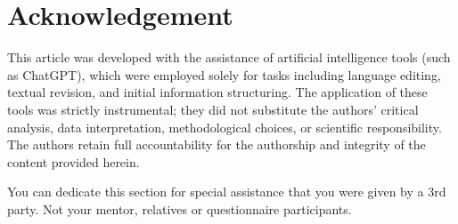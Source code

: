 \section*{Acknowledgement}

This article was developed with the assistance of artificial intelligence tools (such as ChatGPT), which were employed solely for tasks including language editing, textual revision, and initial information structuring. The application of these tools was strictly instrumental; they did not substitute the authors' critical analysis, data interpretation, methodological choices, or scientific responsibility. The authors retain full accountability for the authorship and integrity of the content provided herein.

You can dedicate this section for special assistance that you were given by a 3rd party. Not your mentor, relatives or questionnaire participants.